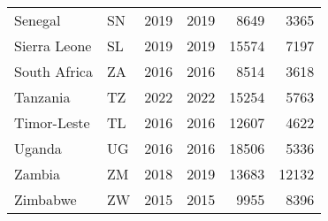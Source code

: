 \begin{table}[ht]
\begin{tabular}{llrrrr}
  Senegal & SN & 2019 & 2019 & 8649 & 3365 \\ 
  Sierra Leone & SL & 2019 & 2019 & 15574 & 7197 \\ 
  South Africa & ZA & 2016 & 2016 & 8514 & 3618 \\ 
  Tanzania & TZ & 2022 & 2022 & 15254 & 5763 \\ 
  Timor-Leste & TL & 2016 & 2016 & 12607 & 4622 \\ 
  Uganda & UG & 2016 & 2016 & 18506 & 5336 \\ 
  Zambia & ZM & 2018 & 2019 & 13683 & 12132 \\ 
  Zimbabwe & ZW & 2015 & 2015 & 9955 & 8396 \\ 
   \hline
\end{tabular}
\end{table}
